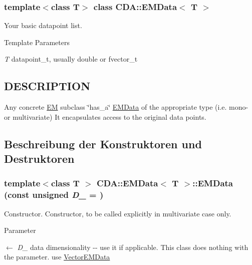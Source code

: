\subsubsection*{template$<$class T$>$ class CDA::EMData$<$ T $>$}

Your basic datapoint list. 
\begin{DoxyTemplParams}{Template Parameters}
\item[{\em T}]datapoint\_\-t, usually double or fvector\_\-t\end{DoxyTemplParams}
\hypertarget{ProbabilisticClustering_8h_09_09_DESCRIPTION}{}\subsection{DESCRIPTION}\label{ProbabilisticClustering_8h_09_09_DESCRIPTION}
Any concrete \hyperlink{classCDA_1_1EM}{EM} subclass \char`\"{}has\_\-a\char`\"{} \hyperlink{classCDA_1_1EMData}{EMData} of the appropriate type (i.e. mono-\/ or multivariate) It encapsulates access to the original data points. 

\subsection{Beschreibung der Konstruktoren und Destruktoren}
\hypertarget{classCDA_1_1EMData_ae81ba273dcb87842699fcc1f6bd7b62a}{
\subsubsection[{EMData}]{\setlength{\rightskip}{0pt plus 5cm}template$<$class T $>$ {\bf CDA::EMData}$<$ T $>$::{\bf EMData} (const unsigned {\em D\_\-} = {})}}
\label{classCDA_1_1EMData_ae81ba273dcb87842699fcc1f6bd7b62a}


Constructor. Constructor, to be called explicitly in multivariate case only. 


\begin{DoxyParams}{Parameter}
\item[\mbox{$\leftarrow$} {\em D\_\-}]data dimensionality -\/-\/ use it if applicable. This class does nothing with the parameter. use \hyperlink{classCDA_1_1VectorEMData}{VectorEMData} \end{DoxyParams}


